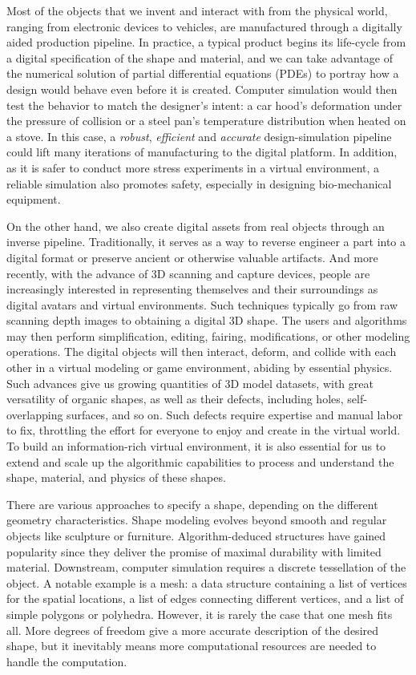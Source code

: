 Most of the objects that we invent and interact with from the physical world, ranging from electronic devices to vehicles, are manufactured through a digitally aided production pipeline.
In practice, a typical product begins its life-cycle from a digital specification of the shape and material, 
and we can take advantage of the numerical solution of partial differential equations (PDEs) to portray how a design would behave even before it is created.
Computer simulation would then test the behavior to match the designer's intent: a car hood's deformation under the pressure of collision or a steel pan's temperature distribution when heated on a stove. In this case, a \emph{robust}, \emph{efficient} and \emph{accurate} design-simulation pipeline could lift many iterations of manufacturing to the digital platform. In addition, as it is safer to conduct more stress experiments in a virtual environment, a reliable simulation also promotes safety, especially in designing bio-mechanical equipment.

On the other hand, we also create digital assets from real objects through an inverse pipeline. Traditionally, it serves as a way to reverse engineer a part into a digital format or preserve ancient or otherwise valuable artifacts. And more recently, with the advance of 3D scanning and capture devices, people are increasingly interested in representing themselves and their surroundings as digital avatars and virtual environments. Such techniques typically go from raw scanning depth images to obtaining a digital 3D shape. The users and algorithms may then perform simplification, editing, fairing, modifications, or other modeling operations. The digital objects will then interact, deform, and collide with each other in a virtual modeling or game environment, abiding by essential physics.
Such advances give us growing quantities of 3D model datasets, with great versatility of organic shapes, as well as their defects, including holes, self-overlapping surfaces, and so on. Such defects require expertise and manual labor to fix, throttling the effort for everyone to enjoy and create in the virtual world. To build an information-rich virtual environment, it is also essential for us to extend and scale up the algorithmic capabilities to process and understand the shape, material, and physics of these shapes.

There are various approaches to specify a shape, depending on the different geometry characteristics. Shape modeling evolves beyond smooth and regular objects like sculpture or furniture. Algorithm-deduced structures have gained popularity since they deliver the promise of maximal durability with limited material. Downstream, computer simulation requires a discrete tessellation of the object. A notable example is a mesh: a data structure containing a list of vertices for the spatial locations, a list of edges connecting different vertices, and a list of simple polygons or polyhedra. However, it is rarely the case that one mesh fits all. More degrees of freedom give a more accurate description of the desired shape, but it inevitably means more computational resources are needed to handle the computation.

